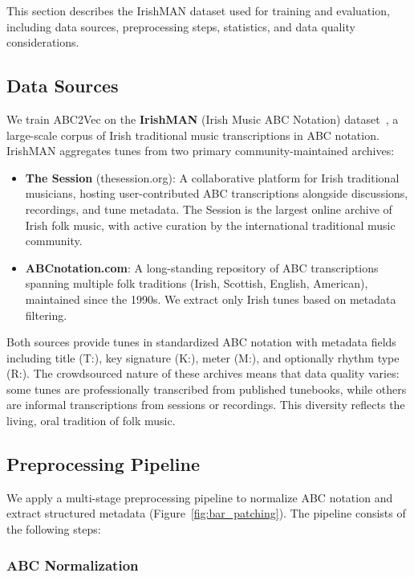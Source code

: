 \documentclass[]{interact}
\theoremstyle{plain}
\theoremstyle{definition}
\theoremstyle{remark}
\begin{document}
This section describes the IrishMAN dataset used for training and evaluation, including data sources, preprocessing steps, statistics, and data quality considerations.

\subsection{Data Sources}

We train ABC2Vec on the \textbf{IrishMAN} (Irish Music ABC Notation) dataset~\cite{IrishMAN2023}, a large-scale corpus of Irish traditional music transcriptions in ABC notation. IrishMAN aggregates tunes from two primary community-maintained archives:

\begin{itemize}
\item \textbf{The Session} (thesession.org): A collaborative platform for Irish traditional musicians, hosting user-contributed ABC transcriptions alongside discussions, recordings, and tune metadata. The Session is the largest online archive of Irish folk music, with active curation by the international traditional music community.

\item \textbf{ABCnotation.com}: A long-standing repository of ABC transcriptions spanning multiple folk traditions (Irish, Scottish, English, American), maintained since the 1990s. We extract only Irish tunes based on metadata filtering.
\end{itemize}

Both sources provide tunes in standardized ABC notation with metadata fields including title (T:), key signature (K:), meter (M:), and optionally rhythm type (R:). The crowdsourced nature of these archives means that data quality varies: some tunes are professionally transcribed from published tunebooks, while others are informal transcriptions from sessions or recordings. This diversity reflects the living, oral tradition of folk music.

\subsection{Preprocessing Pipeline}

We apply a multi-stage preprocessing pipeline to normalize ABC notation and extract structured metadata (Figure~\ref{fig:bar_patching}). The pipeline consists of the following steps:

\subsubsection{ABC Normalization}
\end{document}
